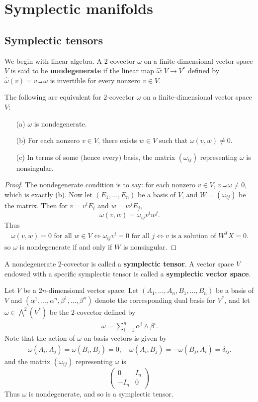 \section{Symplectic manifolds}
\subsection{Symplectic tensors}
We begin with linear algebra. A $2$-covector $\omega$ on a finite-dimensional vector space $V$ is said to be \textbf{nondegenerate} if the linear map $\widehat{\omega}:V\to V^*$ defined by $\widehat{\omega}(v)=v\intprod\omega$ is invertible for every nonzero $v\in V$.
\begin{proposition}
The following are equivalent for $2$-covector $\omega$ on a finite-dimensional vector space $V$:
\begin{itemize}
\item[(a)] $\omega$ is nondegenerate.
\item[(b)] For each nonzero $v\in V$, there exists $w\in V$ such that $\omega(v,w)\neq 0$.
\item[(c)] In terms of some $($hence every$)$ basis, the matrix $(\omega_{ij})$ representing $\omega$ is nonsingular.
\end{itemize}
\end{proposition}
\begin{proof}
The nondegenerate condition is to say: for each nonzero $v\in V$, $v\intprod\omega\neq0$, which is exactly (b). Now let $(E_1,\dots,E_n)$ be a basis of $V$, and $W=(\omega_{ij})$ be the matrix. Then for $v=v^iE_i$ and $w=w^jE_j$,
\[\omega(v,w)=\omega_{ij}v^iw^j.\]
Thus
\begin{align*}
\omega(v,w)=0\text{ for all $w\in V$}\iff \omega_{ij}v^i=0\text{ for all $j$}\iff\text{$v$ is a solution of $W^TX=0$}.
\end{align*}
so $\omega$ is nondegenerate if and only if $W$ is nonsingular.
\end{proof}
A nondegenerate $2$-covector is called a \textbf{symplectic tensor}. A vector space $V$ endowed with a specific symplectic tensor is called a \textbf{symplectic vector space}.
\begin{example}\label{symplectic tensor eg}
Let $V$ be a $2n$-dimensional vector space. Let $(A_1,\dots,A_n,B_1,\dots,B_n)$ be a basis of $V$ and $(\alpha^1,\dots,\alpha^n,\beta^1,\dots,\beta^n)$ denote the corresponding dual basis for $V^*$, and let $\omega\in\bigwedge^2(V^*)$ be the $2$-covector defined by
\begin{align}\label{symplectic tensor-1}
\omega=\sum_{i=1}^{n}\alpha^i\wedge\beta^i.
\end{align}
Note that the action of $\omega$ on basis vectors is given by
\begin{align}\label{symplectic tensor-2}
\omega(A_i,A_j)=\omega(B_i,B_j)=0,\quad \omega(A_i,B_j)=-\omega(B_j,A_i)=\delta_{ij}.
\end{align}
and the matrix $(\omega_{ij})$ representing $\omega$ is
\[\begin{pmatrix}
0&I_n\\
-I_n&0
\end{pmatrix}\]
Thus $\omega$ is nondegenerate, and so is a symplectic tensor.
\end{example}
